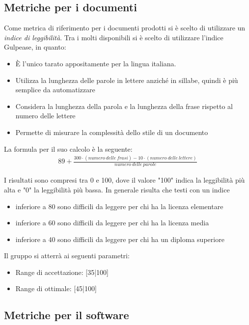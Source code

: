 \documentclass[a4paper]{report}
\begin{document}
			\subsection{Metriche per i documenti}
				Come metrica di riferimento per i documenti prodotti si è scelto di utilizzare un \emph{indice di leggibilità}.
				Tra i molti disponibili si è scelto di utilizzare l'indice Gulpease, in quanto:
				\begin{itemize}
					\item È l'unico tarato appositamente per la lingua italiana.
					\item Utilizza la lunghezza delle parole in lettere anziché in sillabe, quindi è più semplice da automatizzare
					\item Considera la lunghezza della parola e la lunghezza della frase rispetto al numero delle lettere
					\item Permette di misurare la complessità dello stile di un documento
				\end{itemize}
				La formula per il suo calcolo è la seguente:
				\begin{align*}
					89+\frac{300\cdot(numero\ delle\ frasi)-10\cdot(numero\ delle\ lettere)}{numero\ delle\ parole}
				\end{align*}
				
				I risultati sono compresi tra 0 e 100, dove il valore "100" indica la leggibilità più alta e "0" la leggibilità
				più bassa. In generale risulta che testi con un indice
				\begin{itemize}
					\item inferiore a 80 sono difficili da leggere per chi ha la licenza elementare
					\item inferiore a 60 sono difficili da leggere per chi ha la licenza media
					\item inferiore a 40 sono difficili da leggere per chi ha un diploma superiore
				\end{itemize}
	
				Il gruppo si atterrà ai seguenti parametri:
				\begin{itemize}
					\item Range di accettazione: [35|100]
					\item Range di ottimale: [45|100]
				\end{itemize}
				
				
			
			\subsection{Metriche per il software}
			
\end{document}
